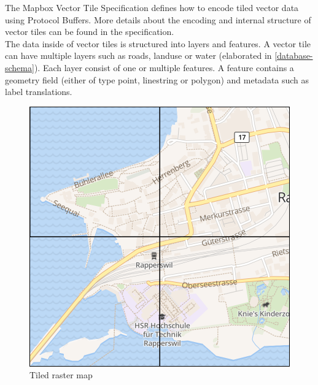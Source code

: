 \noindent\begin{minipage}[t]{0.48\linewidth}
    \vspace{0pt}
    The Mapbox Vector Tile Specification defines how to encode tiled vector data using Protocol Buffers\cite{protobuf_2016}. More details about the encoding and internal structure of vector tiles can be found in the specification\cite{104_mapbox.com_2016}.\\
    
    The data inside of vector tiles is structured into layers and features. A vector tile can have multiple layers such as roads, landuse or water (elaborated in \autoref{database-schema}). Each layer consist of one or multiple features. A feature contains a geometry field (either of type point, linestring or polygon) and metadata such as label translations.
\end{minipage}
\hfill
\begin{minipage}[t]{0.48\linewidth}
    \vspace{-10pt}
    \begin{figure}[H]
        \centering
        \includegraphics[width=\textwidth]{images/tiled_raster}
        \caption{Tiled raster map}
        \label{tiled_raster_map}
    \end{figure}
\end{minipage}




